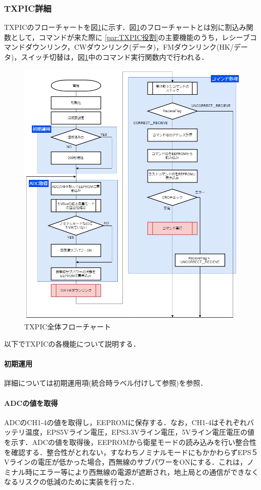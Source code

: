 \subsubsection{TXPIC詳細}\label{subsubsec:TXPIC詳細}
TXPICのフローチャートを図\ref{fig:3-4-2-5}に示す．図\ref{fig:3-4-2-5}のフローチャートとは別に割込み関数として，コマンドが来た際に
\ref{par:TXPIC役割}の主要機能のうち，レシーブコマンドダウンリンク，CWダウンリンク(データ)，FMダウンリンク(HK/データ)，スイッチ切替は，図\ref{fig:3-4-2-5}中のコマンド実行関数内で行われる．
\begin{figure}[H]
	\centering
	\includegraphics[scale=0.6]{03/fig/3-4-2-5.png}
	\caption{TXPIC全体フローチャート}
	\label{fig:3-4-2-5}
\end{figure}
以下でTXPICの各機能について説明する．

\paragraph{初期運用}
詳細については初期運用項(統合時ラベル付けして参照)を参照．

\paragraph{ADCの値を取得}
ADCのCH1-4の値を取得し，EEPROMに保存する．なお，CH1-4はそれぞれバッテリ温度，EPS5Vライン電圧，EPS3.3Vライン電圧，5Vライン電圧電圧の値を示す．ADCの値を取得後，EEPROMから衛星モードの読み込みを行い整合性を確認する．整合性がとれない，すなわちノミナルモードにもかかわらずEPS５Vラインの電圧が低かった場合，西無線のサブパワーをONにする．これは，ノミナル時にエラー等により西無線の電源が遮断され，地上局との通信ができなくなるリスクの低減のために実装を行った．

